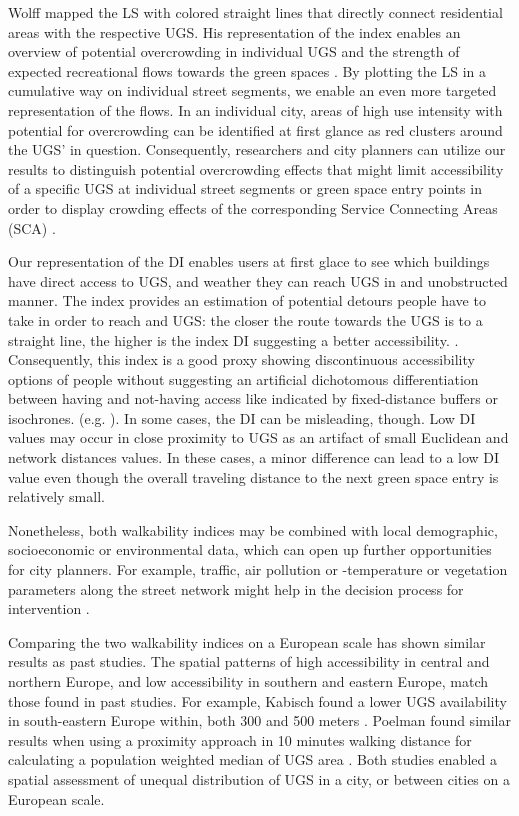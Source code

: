 \documentclass[10pt]{article}
\begin{document}
Wolff mapped the LS with colored straight lines that directly connect residential areas with the respective UGS. 
His representation of the index enables an overview of potential overcrowding in individual UGS and the strength of expected recreational flows towards the green spaces \citep{Wolff.2021}.
By plotting the LS in a cumulative way on individual street segments, we enable an even more targeted representation of the flows.
In an individual city, areas of high use intensity with potential for overcrowding can be identified at first glance as red clusters around the UGS’ in question.
Consequently, researchers and city planners can utilize our results to distinguish potential overcrowding effects that might limit accessibility of a specific UGS at individual street segments or green space entry points in order to display crowding effects of the corresponding Service Connecting Areas (SCA) \citep{Dworczyk.2021, Barthelemy.2018}. 

Our representation of the DI enables users at first glace to see which buildings have direct access to UGS, and weather they can reach UGS in and unobstructed manner. 
The index provides an estimation of potential detours people have to take in order to reach and UGS: the closer the route towards the UGS is to a straight line, the higher is the index DI suggesting a better accessibility. \citep{Esch.2014}. 
Consequently, this index is a good proxy showing discontinuous accessibility options of people without suggesting an artificial dichotomous differentiation between having and not-having access like indicated by fixed-distance buffers or isochrones. (e.g. \cite{Poelman.2018, Kabisch.2016}).
In some cases, the DI can be misleading, though. 
Low DI values may occur in close proximity to UGS as an artifact of small Euclidean and network distances values.
In these cases, a minor difference can lead to a low DI value even though the overall traveling distance to the next green space entry is relatively small.

Nonetheless, both walkability indices may be combined with local demographic, socioeconomic or environmental data, which can open up further opportunities for city planners.
For example, traffic, air pollution or -temperature or vegetation parameters along the street network might help in the decision process for intervention \citep{Poelman.2018}.

Comparing the two walkability indices on a European scale has shown similar results as past studies.
The spatial patterns of high accessibility in central and northern Europe, and low accessibility in southern and eastern Europe, match those found in past studies.
For example, Kabisch found a lower UGS availability in south-eastern Europe within, both 300 and 500 meters \citep{Kabisch.2016}.
Poelman found similar results when using a proximity approach in 10 minutes walking distance for calculating a population weighted median of UGS area \citep{Poelman.2018}. 
Both studies enabled a spatial assessment of unequal distribution of UGS in a city, or between cities on a European scale.
\end{document}
